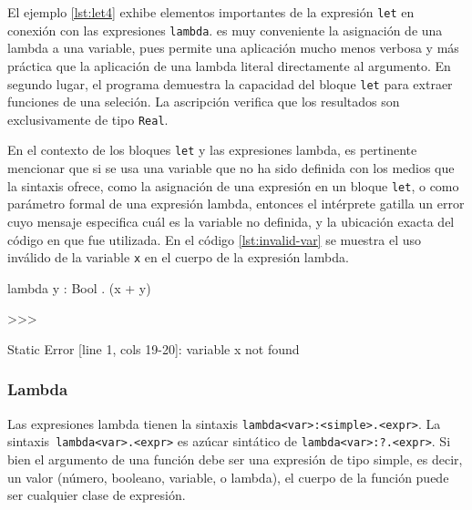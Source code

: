 El ejemplo \ref{lst:let4} exhibe elementos importantes de
la expresión \lstinline|let| en conexión con las expresiones
\lstinline|lambda|. es muy conveniente la asignación de una lambda
a una variable, pues permite una aplicación mucho
menos verbosa y más práctica que la aplicación de
una lambda literal directamente al argumento. En
segundo lugar, el programa demuestra la capacidad del
bloque \lstinline|let| para extraer funciones de una seleción.
La ascripción verifica que los resultados son
exclusivamente de tipo \lstinline|Real|.



En el contexto de los bloques \lstinline|let| y las expresiones
lambda, es pertinente mencionar que si se usa una variable que no ha
sido definida con los medios que la sintaxis ofrece, como la
asignación de una expresión en un bloque \lstinline|let|, o como
parámetro formal de una expresión lambda, entonces el intérprete
gatilla un error cuyo mensaje especifica cuál es la variable no
definida, y la ubicación exacta del código en que fue utilizada.  En
el código \ref{lst:invalid-var} se muestra el uso inválido de la
variable \lstinline|x| en el cuerpo de la expresión lambda.

\begin{gplcblock}[caption={Uso de variable no definida},label={lst:invalid-var}]
lambda y : Bool . (x + y)

>>>

Static Error [line 1, cols 19-20]: variable x not found
\end{gplcblock}


\subsubsection{Lambda}

Las expresiones lambda tienen la sintaxis \lstinline|lambda<var>:<simple>.<expr>|.
La sintaxis\lstinline| lambda<var>.<expr>| es azúcar sintático de
\lstinline|lambda<var>:?.<expr>|. Si bien el argumento de una función
debe ser una expresión de tipo simple, es decir, un valor
(número, booleano, variable, o lambda), el cuerpo
de la función puede ser cualquier clase de expresión.

